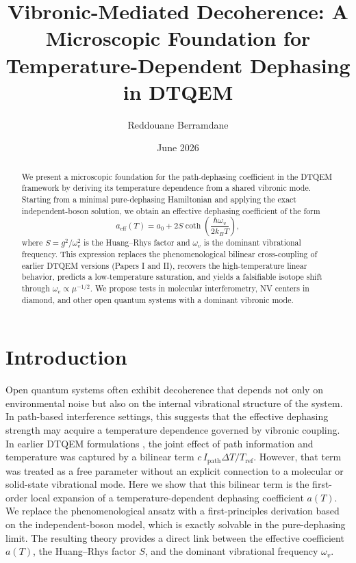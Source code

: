\documentclass[aps,prl,twocolumn,showpacs,superscriptaddress,groupedaddress]{revtex4-2}
\begin{document}
\title{Vibronic-Mediated Decoherence: A Microscopic Foundation for Temperature-Dependent Dephasing in DTQEM}

\author{Reddouane Berramdane}

\date{June 2026}

\begin{abstract}
We present a microscopic foundation for the path-dephasing coefficient in the DTQEM framework by deriving its temperature dependence from a shared vibronic mode. Starting from a minimal pure-dephasing Hamiltonian and applying the exact independent-boson solution, we obtain an effective dephasing coefficient of the form
\[
a_{\mathrm{eff}}(T)=a_0+2S\coth\!\left(\frac{\hbar\omega_v}{2k_B T}\right),
\]
where \(S=g^2/\omega_v^2\) is the Huang–Rhys factor and \(\omega_v\) is the dominant vibrational frequency. This expression replaces the phenomenological bilinear cross-coupling of earlier DTQEM versions (Papers I and II), recovers the high-temperature linear behavior, predicts a low-temperature saturation, and yields a falsifiable isotope shift through \(\omega_v\propto \mu^{-1/2}\). We propose tests in molecular interferometry, NV centers in diamond, and other open quantum systems with a dominant vibronic mode.
\end{abstract}

\maketitle

\section{Introduction}

Open quantum systems often exhibit decoherence that depends not only on environmental noise but also on the internal vibrational structure of the system. In path-based interference settings, this suggests that the effective dephasing strength may acquire a temperature dependence governed by vibronic coupling. In earlier DTQEM formulations \cite{PaperI,PaperII}, the joint effect of path information and temperature was captured by a bilinear term \(c\,I_{\mathrm{path}}\Delta T/T_{\mathrm{ref}}\). However, that term was treated as a free parameter without an explicit connection to a molecular or solid-state vibrational mode. Here we show that this bilinear term is the first-order local expansion of a temperature-dependent dephasing coefficient \(a(T)\). We replace the phenomenological ansatz with a first-principles derivation based on the independent-boson model, which is exactly solvable in the pure-dephasing limit. The resulting theory provides a direct link between the effective coefficient \(a(T)\), the Huang–Rhys factor \(S\), and the dominant vibrational frequency \(\omega_v\).
\end{document}
